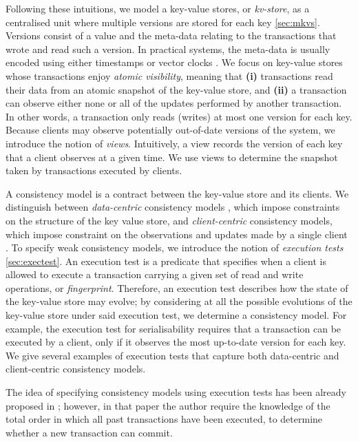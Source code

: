 Following these intuitions, we model a key-value stores, or \emph{kv-store}, as a centralised unit where multiple versions 
are stored for each key \cref{sec:mkvs}. Versions consist of a value and the meta-data relating to the transactions that wrote and 
read such a version. In practical systems, the meta-data is usually encoded using either timestamps 
\cite{physicsnmsi,clockSI} or vector clocks \cite{gdur}. We focus on key-value stores whose transactions 
enjoy \emph{atomic visibility}, meaning that \textbf{(i)} transactions read their data from an atomic 
snapshot of the key-value store, and \textbf{(ii)} a transaction can observe either none or all 
of the updates performed by another transaction. In other words, a transaction only reads (writes) at most 
one version for each key.
Because clients may observe potentially out-of-date versions of the system, we introduce the notion of \emph{views}. 
Intuitively, a view records the version of each key that a client observes at a given time. We use views 
to determine the snapshot taken by transactions executed by clients.

A consistency model is a contract between the key-value store and its clients. We distinguish 
between \emph{data-centric} consistency models \cite{framework-concur}, which impose constraints 
on the structure of the key value store, and \emph{client-centric} consistency models, 
which impose constraint on the observations and updates made by a single client 
\cite{terry1994session}. 
To specify weak consistency models, 
we introduce the notion of \emph{execution tests} \cref{sec:exectest}. An execution test is a predicate 
that specifies when a client is allowed to execute a transaction carrying a given 
set of read and write operations, or \emph{fingerprint}. Therefore, an execution 
test describes how the state of the key-value store may evolve;
by considering at all the possible evolutions of the key-value store under said execution test, 
we determine a consistency model. For example, the execution test for serialisability 
requires that a transaction can be executed by a client, only if it observes the most up-to-date 
version for each key. 
We give several examples of execution tests that capture both data-centric and 
client-centric consistency models. 

The idea of specifying consistency models using execution tests has been 
already proposed in \cite{seebelieve}; however, in that paper the author require 
the knowledge of the total order in which all past transactions have been 
executed, to determine whether a new transaction can commit.

